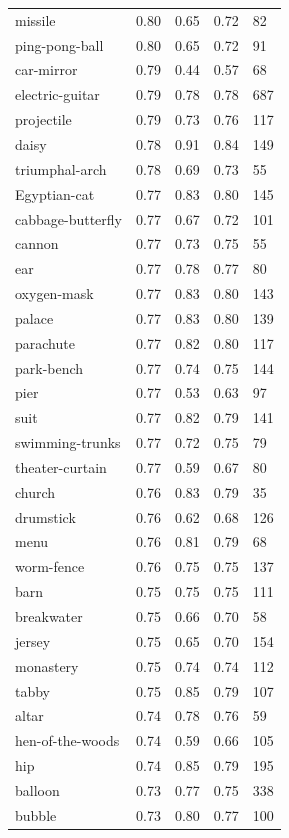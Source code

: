 \begin{center}
\begin{longtable}{lllll}
missile & 0.80 & 0.65 & 0.72 & 82 \\
ping-pong-ball & 0.80 & 0.65 & 0.72 & 91 \\
car-mirror & 0.79 & 0.44 & 0.57 & 68 \\
electric-guitar & 0.79 & 0.78 & 0.78 & 687 \\
projectile & 0.79 & 0.73 & 0.76 & 117 \\
daisy & 0.78 & 0.91 & 0.84 & 149 \\
triumphal-arch & 0.78 & 0.69 & 0.73 & 55 \\
Egyptian-cat & 0.77 & 0.83 & 0.80 & 145 \\
cabbage-butterfly & 0.77 & 0.67 & 0.72 & 101 \\
cannon & 0.77 & 0.73 & 0.75 & 55 \\
ear & 0.77 & 0.78 & 0.77 & 80 \\
oxygen-mask & 0.77 & 0.83 & 0.80 & 143 \\
palace & 0.77 & 0.83 & 0.80 & 139 \\
parachute & 0.77 & 0.82 & 0.80 & 117 \\
park-bench & 0.77 & 0.74 & 0.75 & 144 \\
pier & 0.77 & 0.53 & 0.63 & 97 \\
suit & 0.77 & 0.82 & 0.79 & 141 \\
swimming-trunks & 0.77 & 0.72 & 0.75 & 79 \\
theater-curtain & 0.77 & 0.59 & 0.67 & 80 \\
church & 0.76 & 0.83 & 0.79 & 35 \\
drumstick & 0.76 & 0.62 & 0.68 & 126 \\
menu & 0.76 & 0.81 & 0.79 & 68 \\
worm-fence & 0.76 & 0.75 & 0.75 & 137 \\
barn & 0.75 & 0.75 & 0.75 & 111 \\
breakwater & 0.75 & 0.66 & 0.70 & 58 \\
jersey & 0.75 & 0.65 & 0.70 & 154 \\
monastery & 0.75 & 0.74 & 0.74 & 112 \\
tabby & 0.75 & 0.85 & 0.79 & 107 \\
altar & 0.74 & 0.78 & 0.76 & 59 \\
hen-of-the-woods & 0.74 & 0.59 & 0.66 & 105 \\
hip & 0.74 & 0.85 & 0.79 & 195 \\
balloon & 0.73 & 0.77 & 0.75 & 338 \\
bubble & 0.73 & 0.80 & 0.77 & 100 \\

\end{longtable}
\end{center}
